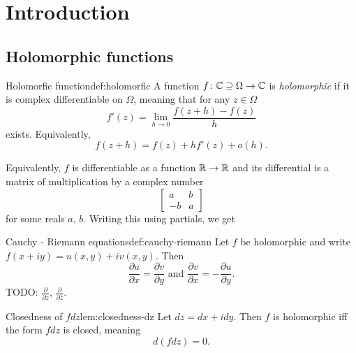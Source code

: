\documentclass[../main.tex]{subfiles}
\begin{document}
    \section{Introduction}

    \subsection{Holomorphic functions}
    
    \begin{definition}{Holomorfic function}{def:holomorfic}
        A function $f \colon \mathbb{C} \supseteq \Omega \to \mathbb{C}$ is \textit{holomorphic} 
        if it is complex differentiable on $\Omega$, meaning that for any
        $z \in \Omega$
        \begin{equation*}
            f'(z) = \lim_{h \to 0} \frac{f(z + h) - f(z)}{h}
        \end{equation*}
        exists. Equivalently,
        \begin{equation*}
            f(z + h) = f(z) + h f'(z) + o(h).
        \end{equation*}
    \end{definition}

    Equivalently, $f$ is differentiable as a function $\mathbb{R} \to \mathbb{R}$ and its
    differential is a matrix of multiplication by a complex number
    \begin{equation*}
        \begin{bmatrix}
            a  & b \\
            -b & a
        \end{bmatrix}
    \end{equation*}
    for some reals $a$, $b$. Writing this using partials, we get

    \begin{definition}{Cauchy - Riemann equations}{def:cauchy-riemann}
        Let $f$ be holomorphic and write $f(x + iy) = u(x, y) + i v(x, y)$. Then
        \begin{equation*}
            \frac{\partial u}{\partial x} = \frac{\partial v}{\partial y}
            \text{ and }
            \frac{\partial v}{\partial x} = -\frac{\partial u}{\partial y}.
        \end{equation*}
        TODO: $\frac{\partial}{\partial z}$, $\frac{\partial}{\partial \overline{z}}$.
    \end{definition}
    
    \begin{lemma}{Closedness of $f dz$}{lem:closedness-dz}
        Let $dz = dx + i dy$. Then $f$ is holomorphic iff the form $f dz$ is closed, meaning
        \begin{equation*}
            d(f dz) = 0.
        \end{equation*}
    \end{lemma}
\end{document}
